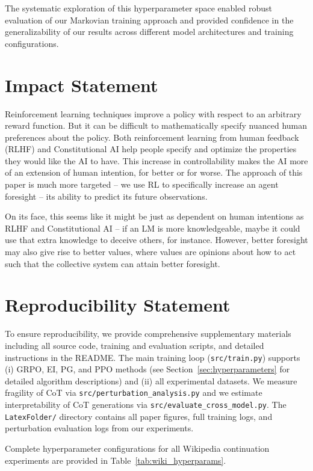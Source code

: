 \documentclass{article}
\begin{document}
The systematic exploration of this hyperparameter space enabled robust evaluation of our Markovian training approach and provided confidence in the generalizability of our results across different model architectures and training configurations.


\section{Impact Statement}
\label{sec:ethics}
Reinforcement learning techniques improve a policy with respect to an arbitrary reward function. But it can be difficult to mathematically specify nuanced human preferences about the policy. Both reinforcement learning from human feedback (RLHF) \citep{christiano2023deepreinforcementlearninghuman} and Constitutional AI \citep{bai2022constitutional} help people specify and optimize the properties they would like the AI to have. This increase in controllability makes the AI more of an extension of human intention, for better or for worse. The approach of this paper is much more targeted -- we use RL to specifically increase an agent foresight -- its ability to predict its future observations. 

On its face, this seems like it might be just as dependent on human intentions as RLHF and Constitutional AI -- if an LM is more knowledgeable, maybe it could use that extra knowledge to deceive others, for instance. However, better foresight may also give rise to better values, where values are opinions about how to act such that the collective system can attain better foresight.

\section{Reproducibility Statement}
To ensure reproducibility, we provide comprehensive supplementary materials including all source code, training and evaluation scripts, and detailed instructions in the README. The main training loop (\texttt{src/train.py}) supports (i) GRPO, EI, PG, and PPO methods (see Section~\ref{sec:hyperparameters} for detailed algorithm descriptions) and (ii) all experimental datasets. We measure fragility of CoT via \texttt{src/perturbation\_analysis.py} and we estimate interpretability of CoT generations via \texttt{src/evaluate\_cross\_model.py}. The \texttt{LatexFolder/} directory contains all paper figures, full training logs, and perturbation evaluation logs from our experiments.

Complete hyperparameter configurations for all Wikipedia continuation experiments are provided in Table~\ref{tab:wiki_hyperparams}.
\end{document}
